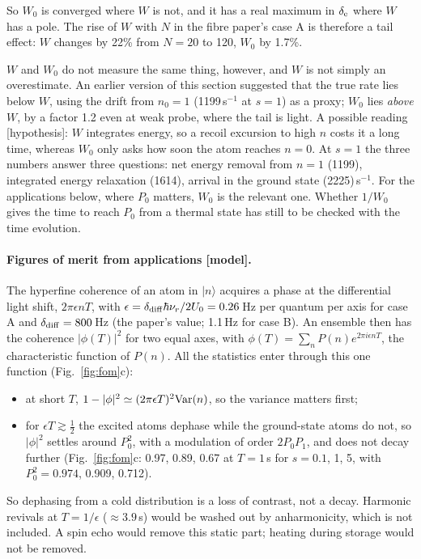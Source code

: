 \documentclass[11pt,a4paper]{article}
\newcommand{\ket}[1]{|#1\rangle}
\newcommand{\nur}{\nu_r}
\begin{document}
So $W_0$ is converged where $W$ is not, and it has a real maximum in $\delta_{\rm e}$ where $W$ has a pole. The rise of $W$ with $N$ in the fibre paper's case A is therefore a tail effect: $W$ changes by 22\% from $N=20$ to 120, $W_0$ by 1.7\%.

$W$ and $W_0$ do not measure the same thing, however, and $W$ is not simply an overestimate. An earlier version of this section suggested that the true rate lies below $W$, using the drift from $n_0=1$ (1199\,s$^{-1}$ at $s=1$) as a proxy; $W_0$ lies \emph{above} $W$, by a factor 1.2 even at weak probe, where the tail is light. A possible reading [hypothesis]: $W$ integrates energy, so a recoil excursion to high $n$ costs it a long time, whereas $W_0$ only asks how soon the atom reaches $n=0$. At $s=1$ the three numbers answer three questions: net energy removal from $n=1$ (1199), integrated energy relaxation (1614), arrival in the ground state (2225)\,s$^{-1}$. For the applications below, where $P_0$ matters, $W_0$ is the relevant one. Whether $1/W_0$ gives the time to reach $P_0$ from a thermal state has still to be checked with the time evolution.

\paragraph{Figures of merit from applications [model].} The hyperfine coherence of an atom in $\ket n$ acquires a phase at the differential light shift, $2\pi\epsilon nT$, with $\epsilon=\delta_{\rm diff}\hbar\nur/2U_0=0.26$\,Hz per quantum per axis for case A and $\delta_{\rm diff}=800$\,Hz (the paper's value; 1.1\,Hz for case B). An ensemble then has the coherence $|\phi(T)|^2$ for two equal axes, with $\phi(T)=\sum_nP(n)e^{2\pi i\epsilon nT}$, the characteristic function of $P(n)$. All the statistics enter through this one function (Fig.~\ref{fig:fom}c):
\begin{itemize}
\item at short $T$, $1-|\phi|^2\simeq(2\pi\epsilon T)^2{\rm Var}(n)$, so the variance matters first;
\item for $\epsilon T\gtrsim\tfrac12$ the excited atoms dephase while the ground-state atoms do not, so $|\phi|^2$ settles around $P_0^2$, with a modulation of order $2P_0P_1$, and does not decay further (Fig.~\ref{fig:fom}c: 0.97, 0.89, 0.67 at $T=1$\,s for $s=0.1$, 1, 5, with $P_0^2=0.974$, 0.909, 0.712).
\end{itemize}
So dephasing from a cold distribution is a loss of contrast, not a decay. Harmonic revivals at $T=1/\epsilon$ ($\approx3.9$\,s) would be washed out by anharmonicity, which is not included. A spin echo would remove this static part; heating during storage would not be removed.
\end{document}
